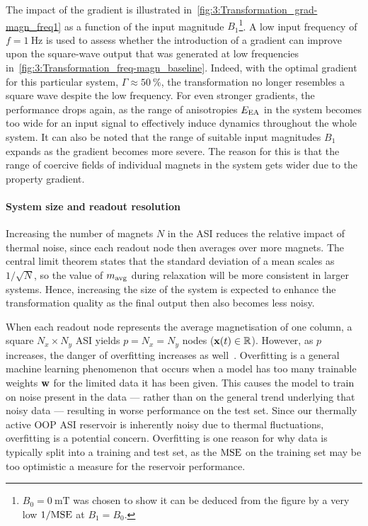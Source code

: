 The impact of the gradient is illustrated in~\cref{fig:3:Transformation_grad-magn_freq1} as a function of the input magnitude $B_1$\footnote{
	$B_0 = \SI{0}{\milli\tesla}$ was chosen to show it can be deduced from the figure by a very low $1/\mathrm{MSE}$ at $B_1 = B_0$.
}.
A low input frequency of $f=\SI{1}{\hertz}$ is used to assess whether the introduction of a gradient can improve upon the square-wave output that was generated at low frequencies in~\cref{fig:3:Transformation_freq-magn_baseline}.
Indeed, with the optimal gradient for this particular system, $\Gamma \approx \SI{50}{\percent}$, the transformation no longer resembles a square wave despite the low frequency.
For even stronger gradients, the performance drops again, as the range of anisotropies $E_\mathrm{EA}$ in the system becomes too wide for an input signal to effectively induce dynamics throughout the whole system.
It can also be noted that the range of suitable input magnitudes $B_1$ expands as the gradient becomes more severe.
The reason for this is that the range of coercive fields of individual magnets in the system gets wider due to the property gradient.

\paragraph{System size and readout resolution}
Increasing the number of magnets $N$ in the ASI reduces the relative impact of thermal noise, since each readout node then averages over more magnets.
The central limit theorem states that the standard deviation of a mean scales as $1/\sqrt{N}$, so the value of $m_\mathrm{avg}$ during relaxation will be more consistent in larger systems.
Hence, increasing the size of the system is expected to enhance the transformation quality as the final output then also becomes less noisy. \\\par
When each readout node represents the average magnetisation of one column, a square $N_x \times N_y$ ASI yields $p = N_x = N_y$ nodes ($\boldsymbol{\mathbf{x}}(t) \in \mathbb{R}$).
However, as $p$ increases, the danger of overfitting increases as well~\cite{DeepRC_IonGating_Overfitting,lukovsevivcius2009reservoir}.
Overfitting is a general machine learning phenomenon that occurs when a model has too many trainable weights $\boldsymbol{\mathbf{w}}$ for the limited data it has been given.
This causes the model to train on noise present in the data --- rather than on the general trend underlying that noisy data --- resulting in worse performance on the test set.
Since our thermally active OOP ASI reservoir is inherently noisy due to thermal fluctuations, overfitting is a potential concern.
Overfitting is one reason for why data is typically split into a training and test set, as the $\mathrm{MSE}$ on the training set may be too optimistic a measure for the reservoir performance. \\\par

